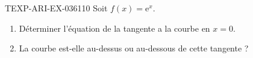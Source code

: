 \begin{exercice}{TEXP-ARI-EX-036}{1}{10}
Soit $f(x) = \mathrm{e}^x$.
\begin{enumerate}
  \item Déterminer l'équation de la tangente a la courbe en $x = 0$.
  \item La courbe est-elle au-dessus ou au-dessous de cette tangente ?
\end{enumerate}

\end{exercice}
